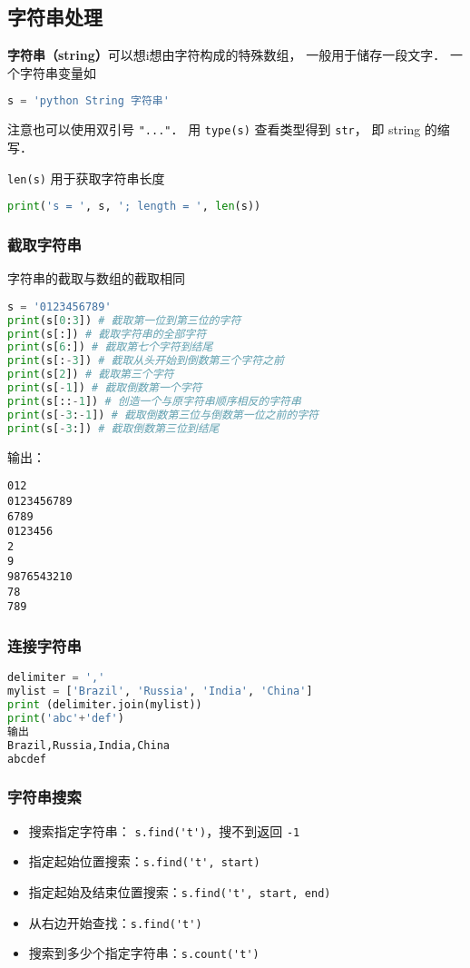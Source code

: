 

\subsection{字符串处理}
\textbf{字符串（string）}可以想i想由字符构成的特殊数组， 一般用于储存一段文字． 一个字符串变量如
\begin{lstlisting}[language=python]
s = 'python String 字符串'
\end{lstlisting}
注意也可以使用双引号 \verb|"..."|． 用 \verb|type(s)| 查看类型得到 \verb|str|， 即 string 的缩写．

\verb|len(s)| 用于获取字符串长度
\begin{lstlisting}[language=python]
print('s = ', s, '; length = ', len(s))
\end{lstlisting}

\subsubsection{截取字符串}
字符串的截取与数组的截取相同
\begin{lstlisting}[language=python]
s = '0123456789'
print(s[0:3]) # 截取第一位到第三位的字符
print(s[:]) # 截取字符串的全部字符
print(s[6:]) # 截取第七个字符到结尾
print(s[:-3]) # 截取从头开始到倒数第三个字符之前
print(s[2]) # 截取第三个字符
print(s[-1]) # 截取倒数第一个字符
print(s[::-1]) # 创造一个与原字符串顺序相反的字符串
print(s[-3:-1]) # 截取倒数第三位与倒数第一位之前的字符
print(s[-3:]) # 截取倒数第三位到结尾
\end{lstlisting}
输出：
\begin{lstlisting}
012
0123456789
6789
0123456
2
9
9876543210
78
789
\end{lstlisting}

\subsubsection{连接字符串}
\begin{lstlisting}[language=python]
delimiter = ','
mylist = ['Brazil', 'Russia', 'India', 'China']
print (delimiter.join(mylist))
print('abc'+'def')
输出
Brazil,Russia,India,China
abcdef
\end{lstlisting}

\subsubsection{字符串搜索}
\begin{itemize}
\item 搜索指定字符串： \verb|s.find('t')|，搜不到返回 \verb|-1|
\item 指定起始位置搜索：\verb|s.find('t', start)|
\item 指定起始及结束位置搜索：\verb|s.find('t', start, end)|
\item 从右边开始查找：\verb|s.find('t')|
\item 搜索到多少个指定字符串：\verb|s.count('t')|
\end{itemize}

